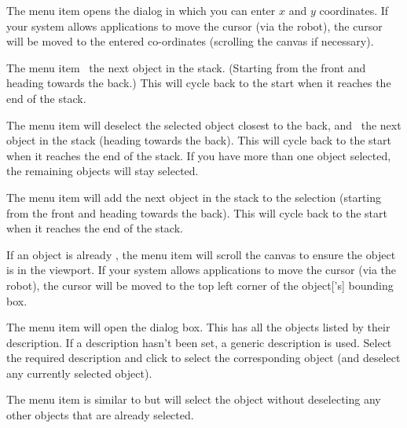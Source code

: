 
The  menu item opens the
 dialog in which you can enter $x$ and $y$
coordinates. If your system allows applications to move the cursor
(via the \gls{robot}), the cursor will be moved to the entered
co-ordinates (scrolling the \gls{canvas} if necessary).


The  menu item 
\selects\ the next \gls{object} in the \gls{stack}. (Starting from the
\gls{front} and heading towards the \gls{back}.) This will cycle back to
the start when it reaches the end of the \gls{stack}.


The  menu item will deselect the
selected \gls{object} closest to the \gls{back}, and \select\
the next \gls{object} in the \gls{stack} (heading towards the \gls{back}). This
will cycle back to the start when it reaches the end of the stack.
If you have more than one \gls{object} selected, the remaining
\glspl*{object} will stay selected.


The  menu item will add
the next \gls{object} in the \gls{stack} to the selection (starting from
the \gls{front} and heading towards the \gls{back}). This will cycle back to
the start when it reaches the end of the stack.


If an \gls{object} is already \selected, the 
menu item will scroll the \gls{canvas} to ensure the \gls{object} is
in the viewport. If your system allows applications to move the
cursor (via the \gls{robot}), the cursor will be moved to the top left corner of the
\gls{object}['s] bounding box.


The  menu item will open the
 dialog box. This has all the \glspl{object}
listed by their description.  If a description hasn't been set, a
generic description is used.  Select the required description and
click \btn{okay} to select the corresponding \gls{object} (and
deselect any currently selected \gls{object}).


The  menu item is similar to 
 but will select the \gls{object}
without deselecting any other \glspl{object} that are already
selected.

